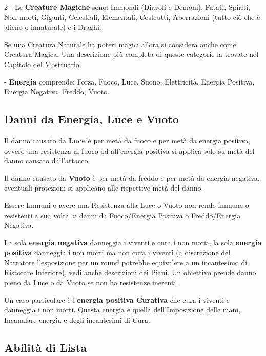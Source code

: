\begin{multicols}{2}
- Le \textbf{Creature Magiche} sono: Immondi (Diavoli e Demoni), Fatati, Spiriti, Non morti, Giganti, Celestiali, Elementali, Costrutti, Aberrazioni (tutto ciò che è alieno o innaturale) e i Draghi.

Se una Creatura Naturale ha poteri magici allora si considera anche come Creatura Magica. Una descrizione più completa di queste categorie la trovate nel Capitolo del Mostruario.

- \textbf{Energia} comprende: Forza, Fuoco, Luce, Suono, Elettricità, Energia Positiva, Energia Negativa, Freddo, Vuoto.\label{elencoenergia}\hypertarget{elencoenergia}{}

\subsection{Danni da Energia, Luce e Vuoto}

Il danno causato da \textbf{Luce} è per metà da fuoco e per metà da energia positiva, ovvero una resistenza al fuoco od all'energia positiva si applica solo su metà del danno causato dall'attacco.

Il danno causato da \textbf{Vuoto} è per metà da freddo e per metà da energia negativa, eventuali protezioni si applicano alle rispettive metà del danno.

Essere Immuni o avere una Resistenza alla Luce o Vuoto non rende immune o resistenti a sua volta ai danni da Fuoco/Energia Positiva o Freddo/Energia Negativa.

La sola \textbf{energia negativa} danneggia i viventi e cura i non morti, la sola \textbf{energia positiva} danneggia i non morti ma non cura i viventi (a discrezione del Narratore l'esposizione per un round potrebbe equivalere a un incantesimo di Ristorare Inferiore), vedi anche descrizioni dei Piani. Un obiettivo prende danno pieno da Luce o da Vuoto se non ha resistenze inerenti.

Un caso particolare è l'\textbf{energia positiva Curativa} che cura i viventi e danneggia i non morti. Questa energia è quella dell'Imposizione delle mani, Incanalare energia e degli incantesimi di Cura.

\subsection{Abilità di Lista}\label{abilitadilista}\hypertarget{abilitadilista}{}


\end{multicols}
